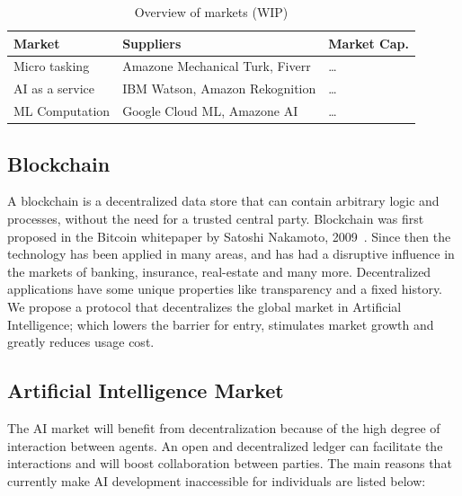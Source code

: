 \documentclass{article}
\begin{document}
\begin{table}[htb]
  \centering
  \begin{tabular}[h]{l|l|l}
    \textbf{Market} & \textbf{Suppliers} & \textbf{Market Cap.} \\ \hline
    Micro tasking & Amazone Mechanical Turk, Fiverr & \dots \\ 
    AI as a service & IBM Watson, Amazon Rekognition & \dots \\
    ML Computation & Google Cloud ML, Amazone AI & \dots 
  \end{tabular}
  \caption{Overview of markets (WIP)}\label{tab:service_compare}
\end{table}

\subsection{Blockchain}
A blockchain is a decentralized data store that can contain arbitrary
logic and processes, without the need for a trusted central
party. Blockchain was first proposed in the Bitcoin whitepaper by
Satoshi Nakamoto, 2009~\cite{nakamoto2008bitcoin}. Since then the technology
has been applied in many areas, and has had a disruptive
influence in the markets of banking, insurance, real-estate and many
more. Decentralized applications have some unique properties like
transparency and a fixed history. We propose a protocol that
decentralizes the global market in Artificial Intelligence; which
lowers the barrier for entry, stimulates market growth and greatly
reduces usage cost.

\subsection{Artificial Intelligence Market}
The AI market will benefit from decentralization because of the high
degree of interaction between agents. An open and decentralized ledger 
can facilitate the interactions and will boost collaboration between parties.
The main reasons that currently make AI development
inaccessible for individuals are listed below:
\end{document}
